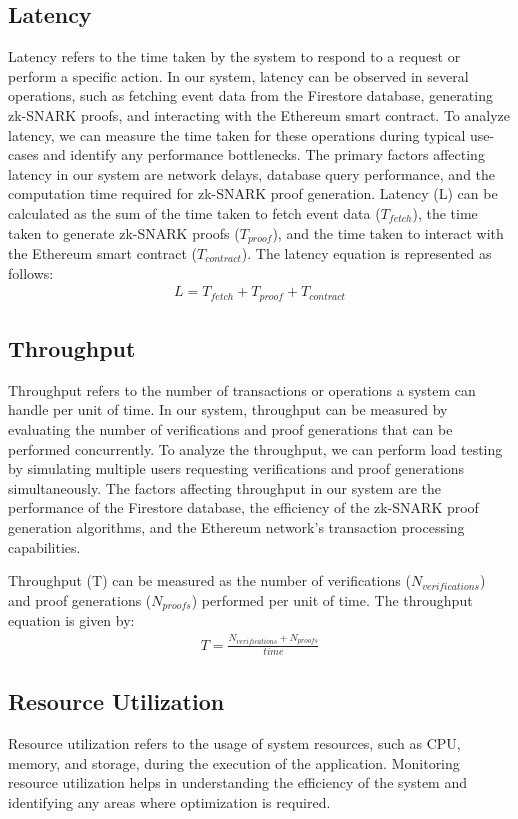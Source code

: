 \subsection{Latency}
Latency refers to the time taken by the system to respond to a request or perform a specific action. In our system, latency can be observed in several operations, such as fetching event data from the Firestore database, generating zk-SNARK proofs, and interacting with the Ethereum smart contract.
To analyze latency, we can measure the time taken for these operations during typical use-cases and identify any performance bottlenecks. The primary factors affecting latency in our system are network delays, database query performance, and the computation time required for zk-SNARK proof generation.
Latency (L) can be calculated as the sum of the time taken to fetch event data ($T_{fetch}$), the time taken to generate zk-SNARK proofs ($T_{proof}$), and the time taken to interact with the Ethereum smart contract ($T_{contract}$). The latency equation is represented as follows:
\begin{align}
L = T_{fetch} + T_{proof} + T_{contract}\label{EqLatency}
\end{align}

\subsection{Throughput}
Throughput refers to the number of transactions or operations a system can handle per unit of time. In our system, throughput can be measured by evaluating the number of verifications and proof generations that can be performed concurrently. To analyze the throughput, we can perform load testing by simulating multiple users requesting verifications and proof generations simultaneously.
The factors affecting throughput in our system are the performance of the Firestore database, the efficiency of the zk-SNARK proof generation algorithms, and the Ethereum network's transaction processing capabilities.

Throughput (T) can be measured as the number of verifications ($N_{verifications}$) and proof generations ($N_{proofs}$) performed per unit of time. The throughput equation is given by:
\begin{align}
T = \frac{N_{verifications} + N_{proofs}}{time}\label{EqThroughput}
\end{align}

\subsection{Resource Utilization}
Resource utilization refers to the usage of system resources, such as CPU, memory, and storage, during the execution of the application. Monitoring resource utilization helps in understanding the efficiency of the system and identifying any areas where optimization is required.

